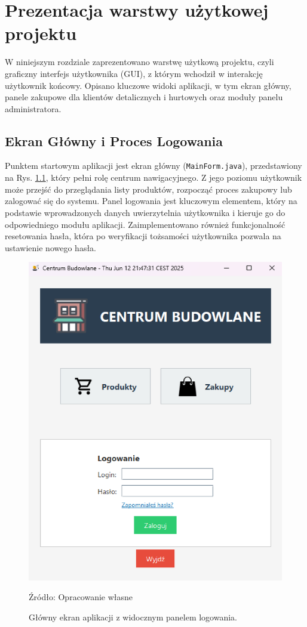 
\chapter{Prezentacja warstwy użytkowej projektu}
\label{chap:warstwa_uzytkowa}
W niniejszym rozdziale zaprezentowano warstwę użytkową projektu, czyli graficzny interfejs użytkownika (GUI), z którym wchodził w interakcję użytkownik końcowy. Opisano kluczowe widoki aplikacji, w tym ekran główny, panele zakupowe dla klientów detalicznych i hurtowych oraz moduły panelu administratora.

\section{Ekran Główny i Proces Logowania}
Punktem startowym aplikacji jest ekran główny (\texttt{MainForm.java}), przedstawiony na Rys. \ref{fig:main_form}, który pełni rolę centrum nawigacyjnego. Z jego poziomu użytkownik może przejść do przeglądania listy produktów, rozpocząć proces zakupowy lub zalogować się do systemu. Panel logowania jest kluczowym elementem, który na podstawie wprowadzonych danych uwierzytelnia użytkownika i kieruje go do odpowiedniego modułu aplikacji. Zaimplementowano również funkcjonalność resetowania hasła, która po weryfikacji tożsamości użytkownika pozwala na ustawienie nowego hasła.

\begin{figure}[H]
    \centering
    \includegraphics[width=0.6\linewidth]{figures/fig_0010.eps} 
    \caption{Główny ekran aplikacji z widocznym panelem logowania.}
    \label{fig:main_form}
    \small{Źródło: Opracowanie własne}
\end{figure}
\clearpage

